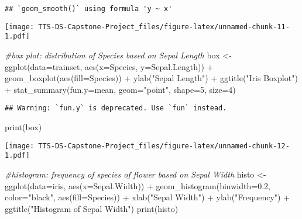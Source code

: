 \documentclass[
]{article}
\newenvironment{Shaded}{\begin{snugshade}}{\end{snugshade}}
\newcommand{\AttributeTok}[1]{\textcolor[rgb]{0.77,0.63,0.00}{#1}}
\newcommand{\CommentTok}[1]{\textcolor[rgb]{0.56,0.35,0.01}{\textit{#1}}}
\newcommand{\DecValTok}[1]{\textcolor[rgb]{0.00,0.00,0.81}{#1}}
\newcommand{\FloatTok}[1]{\textcolor[rgb]{0.00,0.00,0.81}{#1}}
\newcommand{\FunctionTok}[1]{\textcolor[rgb]{0.00,0.00,0.00}{#1}}
\newcommand{\NormalTok}[1]{#1}
\newcommand{\OtherTok}[1]{\textcolor[rgb]{0.56,0.35,0.01}{#1}}
\newcommand{\SpecialCharTok}[1]{\textcolor[rgb]{0.00,0.00,0.00}{#1}}
\newcommand{\StringTok}[1]{\textcolor[rgb]{0.31,0.60,0.02}{#1}}
\begin{document}
\begin{verbatim}
## `geom_smooth()` using formula 'y ~ x'
\end{verbatim}

\texttt{[image: TTS-DS-Capstone-Project\_files/figure-latex/unnamed-chunk-11-1.pdf]}

\begin{Shaded}
\begin{Highlighting}[]
\CommentTok{\#box plot: distribution of Species based on Sepal Length}
\NormalTok{box }\OtherTok{\textless{}{-}} \FunctionTok{ggplot}\NormalTok{(}\AttributeTok{data=}\NormalTok{trainset, }\FunctionTok{aes}\NormalTok{(}\AttributeTok{x=}\NormalTok{Species, }\AttributeTok{y=}\NormalTok{Sepal.Length)) }\SpecialCharTok{+}
    \FunctionTok{geom\_boxplot}\NormalTok{(}\FunctionTok{aes}\NormalTok{(}\AttributeTok{fill=}\NormalTok{Species)) }\SpecialCharTok{+} 
    \FunctionTok{ylab}\NormalTok{(}\StringTok{"Sepal Length"}\NormalTok{) }\SpecialCharTok{+}
    \FunctionTok{ggtitle}\NormalTok{(}\StringTok{"Iris Boxplot"}\NormalTok{) }\SpecialCharTok{+}
    \FunctionTok{stat\_summary}\NormalTok{(}\AttributeTok{fun.y=}\NormalTok{mean, }\AttributeTok{geom=}\StringTok{"point"}\NormalTok{, }\AttributeTok{shape=}\DecValTok{5}\NormalTok{, }\AttributeTok{size=}\DecValTok{4}\NormalTok{) }
\end{Highlighting}
\end{Shaded}

\begin{verbatim}
## Warning: `fun.y` is deprecated. Use `fun` instead.
\end{verbatim}

\begin{Shaded}
\begin{Highlighting}[]
\FunctionTok{print}\NormalTok{(box)}
\end{Highlighting}
\end{Shaded}

\texttt{[image: TTS-DS-Capstone-Project\_files/figure-latex/unnamed-chunk-12-1.pdf]}

\begin{Shaded}
\begin{Highlighting}[]
\CommentTok{\#histogram: frequency of species of flower based on Sepal Width}
\NormalTok{histo }\OtherTok{\textless{}{-}} \FunctionTok{ggplot}\NormalTok{(}\AttributeTok{data=}\NormalTok{iris, }\FunctionTok{aes}\NormalTok{(}\AttributeTok{x=}\NormalTok{Sepal.Width)) }\SpecialCharTok{+}
    \FunctionTok{geom\_histogram}\NormalTok{(}\AttributeTok{binwidth=}\FloatTok{0.2}\NormalTok{, }\AttributeTok{color=}\StringTok{"black"}\NormalTok{, }\FunctionTok{aes}\NormalTok{(}\AttributeTok{fill=}\NormalTok{Species)) }\SpecialCharTok{+} 
    \FunctionTok{xlab}\NormalTok{(}\StringTok{"Sepal Width"}\NormalTok{) }\SpecialCharTok{+}  
    \FunctionTok{ylab}\NormalTok{(}\StringTok{"Frequency"}\NormalTok{) }\SpecialCharTok{+} 
    \FunctionTok{ggtitle}\NormalTok{(}\StringTok{"Histogram of Sepal Width"}\NormalTok{)}
\FunctionTok{print}\NormalTok{(histo)}
\end{Highlighting}
\end{Shaded}
\end{document}
